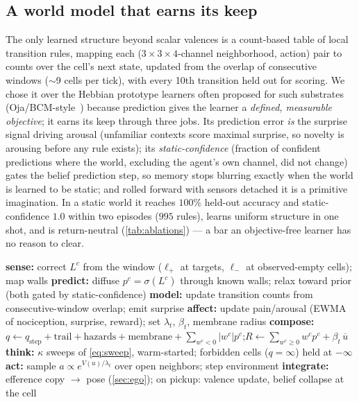 \documentclass[11pt]{article}
\begin{document}
\subsection{A world model that earns its keep}
\label{sec:schema}
The only learned structure beyond scalar valences is a count-based table of local transition rules, mapping each ($3{\times}3{\times}4$-channel neighborhood, action) pair to counts over the cell's next state, updated from the overlap of consecutive windows ($\sim$9 cells per tick), with every 10th transition held out for scoring. We chose it over the Hebbian prototype learners often proposed for such substrates (Oja/BCM-style~\citep{oja1982}) because prediction gives the learner a \emph{defined, measurable objective}; it earns its keep through three jobs. Its prediction error \emph{is} the surprise signal driving arousal (unfamiliar contexts score maximal surprise, so novelty is arousing before any rule exists); its \emph{static-confidence} (fraction of confident predictions where the world, excluding the agent's own channel, did not change) gates the belief prediction step, so memory stops blurring exactly when the world is learned to be static; and rolled forward with sensors detached it is a primitive imagination. In a static world it reaches $100\%$ held-out accuracy and static-confidence $1.0$ within two episodes ($995$ rules), learns uniform structure in one shot, and is return-neutral (\cref{tab:ablations}) --- a bar an objective-free learner has no reason to clear.

\begin{algorithm}[t]
\caption{One EFI tick (all operations radius-1 stencils or per-cell).}
\label{alg:tick}
\begin{algorithmic}[1]
\State \textbf{sense:} correct $L^c$ from the window ($\ell_+$ at targets, $\ell_-$ at observed-empty cells); map walls
\State \textbf{predict:} diffuse $p^c{=}\sigma(L^c)$ through known walls; relax toward prior (both gated by static-confidence)
\State \textbf{model:} update transition counts from consecutive-window overlap; emit surprise
\State \textbf{affect:} update pain/arousal (EWMA of nociception, surprise, reward); set $\lambda_t$, $\beta_t$, membrane radius
\State \textbf{compose:} $q \gets q_{\text{step}} + \text{trail} + \text{hazards} + \text{membrane} + \sum_{w^c<0}|w^c|p^c$;\quad $R \gets \sum_{w^c\ge0} w^c p^c + \beta_t\,\overline{u}$
\State \textbf{think:} $\kappa$ sweeps of \cref{eq:sweep}, warm-started; forbidden cells ($q{=}\infty$) held at $-\infty$
\State \textbf{act:} sample $a \propto e^{V(u)/\lambda_t}$ over open neighbors; step environment
\State \textbf{integrate:} efference copy $\to$ pose (\cref{sec:ego}); on pickup: valence update, belief collapse at the cell
\end{algorithmic}
\end{algorithm}
\end{document}
